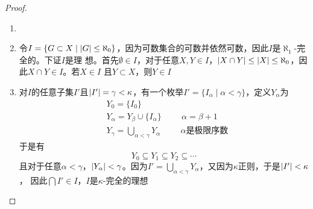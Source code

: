 \documentclass[11pt]{article}
\begin{document}
\begin{proof}
\begin{enumerate}
\item 

\item 令\(I=\{G\subset X\mid\abs{G}\le\aleph_0\}\)，因为可数集合的可数并依然可数，因此\(I\)是\(\aleph_1\)-完全的。下证\(I\)是理
想。首先\(\emptyset\in I\)，对于任意\(X,Y\in I\)，\(\abs{X\cap Y}\le\abs{X}\le\aleph_0\)，因此\(X\cap Y\in I\)。若\(X\in I\)
且\(Y\subset X\)，则\(Y\in I\)
\item 对\(I\)的任意子集\(I'\)且\(\abs{I'}=\gamma<\kappa\)，有一个枚举\(I'=\{I_\alpha\mid\alpha<\gamma\}\)，定义\(Y_\alpha\)为
\begin{align*}
 &Y_0=\{I_0\}\\
 &Y_\alpha=Y_\beta\cup \{I_\alpha\}\hspace{1cm}\alpha=\beta+1\\
 &Y_\gamma=\bigcup_{\alpha<\gamma}Y_\alpha\hspace{1cm}\alpha\text{是极限序数}
\end{align*}
于是有
\begin{equation*}
Y_0\subseteq Y_1\subseteq Y_2\subseteq\cdots
\end{equation*}
且对于任意\(\alpha<\gamma\)，\(\abs{Y_\alpha}<\gamma\)。因为\(I'=\bigcup_{\alpha<\gamma} Y_\alpha\)，又因为\(\kappa\)正则，于是\(\abs{I'}<\kappa\)，
因此\(\bigcap I'\in I\)，\(I\)是\(\kappa\)-完全的理想
\end{enumerate}
\end{proof}
\end{document}
